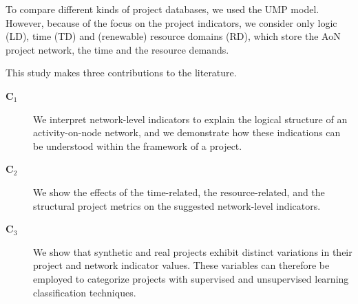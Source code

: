 \documentclass[preprint,
3p]{elsarticle} %
\begin{document}
To compare different kinds of project databases, we used the UMP model.
However, because of the focus on the project indicators, we consider
only logic (LD), time (TD) and (renewable) resource domains (RD), which
store the AoN project network, the time and the resource demands.

This study makes three contributions to the literature.

\begin{description}
\item[$\mathbf{C}_1$\label{C1}] We interpret network-level indicators to explain the logical structure of an activity-on-node network, and we demonstrate how these indications can be understood within the framework of a project.
\item[$\mathbf{C}_2$\label{C2}] We show the effects of the time-related, the resource-related, and the structural project metrics on the suggested network-level indicators.
\item[$\mathbf{C}_3$\label{C3}] We show that synthetic and real projects exhibit distinct variations in their project and network indicator values. These variables can therefore be employed to categorize projects with supervised and unsupervised learning classification techniques.
\end{description}
\end{document}
